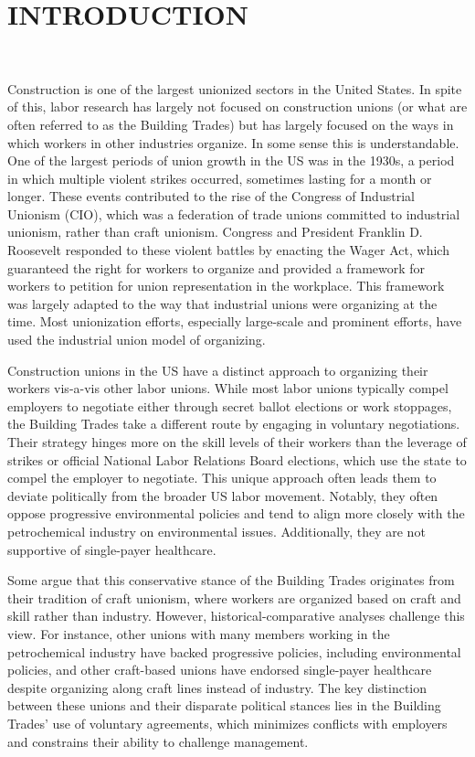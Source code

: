\tableofcontents
\newpage


\section{INTRODUCTION} \

Construction is one of the largest unionized sectors in the United States. In spite of this, labor research has largely not focused on construction unions (or what are often referred to as the Building Trades) but has largely focused on the ways in which workers in other industries organize. In some sense this is understandable. One of the largest periods of union growth in the US was in the 1930s, a period in which multiple violent strikes occurred, sometimes lasting for a month or longer. These events contributed to the rise of the Congress of Industrial Unionism (CIO), which was a federation of trade unions committed to industrial unionism, rather than craft unionism. Congress and President Franklin D. Roosevelt responded to these violent battles by enacting the Wager Act, which guaranteed the right for workers to organize and provided a framework for workers to petition for union representation in the workplace. This framework was largely adapted to the way that industrial unions were organizing at the time. Most unionization efforts, especially large-scale and prominent efforts, have used the industrial union model of organizing.

Construction unions in the US have a distinct approach to organizing their workers vis-a-vis other labor unions. While most labor unions typically compel employers to negotiate either through secret ballot elections or work stoppages, the Building Trades take a different route by engaging in voluntary negotiations. Their strategy hinges more on the skill levels of their workers than the leverage of strikes or official National Labor Relations Board elections, which use the state to compel the employer to negotiate. This unique approach often leads them to deviate politically from the broader US labor movement. Notably, they often oppose progressive environmental policies and tend to align more closely with the petrochemical industry on environmental issues. Additionally, they are not supportive of single-payer healthcare.

Some argue that this conservative stance of the Building Trades originates from their tradition of craft unionism, where workers are organized based on craft and skill rather than industry. However, historical-comparative analyses challenge this view. For instance, other unions with many members working in the petrochemical industry have backed progressive policies, including environmental policies, and other craft-based unions have endorsed single-payer healthcare despite organizing along craft lines instead of industry. The key distinction between these unions and their disparate political stances lies in the Building Trades' use of voluntary agreements, which minimizes conflicts with employers and constrains their ability to challenge management.

